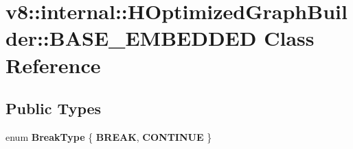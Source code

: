 \hypertarget{classv8_1_1internal_1_1_h_optimized_graph_builder_1_1_b_a_s_e___e_m_b_e_d_d_e_d}{}\section{v8\+:\+:internal\+:\+:H\+Optimized\+Graph\+Builder\+:\+:B\+A\+S\+E\+\_\+\+E\+M\+B\+E\+D\+D\+E\+D Class Reference}
\label{classv8_1_1internal_1_1_h_optimized_graph_builder_1_1_b_a_s_e___e_m_b_e_d_d_e_d}
\subsection*{Public Types}
\begin{DoxyCompactItemize}
\item 
\hypertarget{classv8_1_1internal_1_1_h_optimized_graph_builder_1_1_b_a_s_e___e_m_b_e_d_d_e_d_a464807e62018ec427bd7b0723c17879b}{}enum {\bfseries Break\+Type} \{ {\bfseries B\+R\+E\+A\+K}, 
{\bfseries C\+O\+N\+T\+I\+N\+U\+E}
 \}\label{classv8_1_1internal_1_1_h_optimized_graph_builder_1_1_b_a_s_e___e_m_b_e_d_d_e_d_a464807e62018ec427bd7b0723c17879b}

\end{DoxyCompactItemize}
